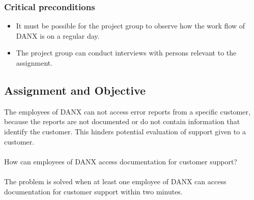 \documentclass[pdftext, 12pt, a4paper]{report}
\begin{document}
\subsubsection*{Critical preconditions}
\begin{itemize}
	\item It must be possible for the project group to observe how the work flow of DANX is on a regular day.
	\item The project group can conduct interviews with persons relevant to the assignment.
	\end{itemize}
\newpage
\subsection*{Assignment and Objective}
The employees of DANX can not access error reports from a specific customer, because the reports are not documented or do not contain information that identify the customer. This hinders potential evaluation of support given to a customer. \\ \\
How can employees of DANX access documentation for customer support? \\ \\
The problem is solved when at least one employee of DANX can access documentation for customer support within two minutes.
\end{document}
